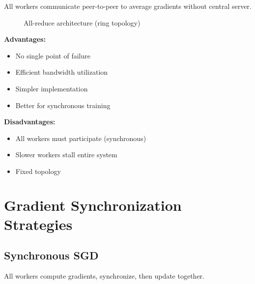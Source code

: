All workers communicate peer-to-peer to average gradients without central server.

\begin{figure}[h]
\centering
{}
\caption{All-reduce architecture (ring topology)}
\label{fig:allreduce}
\end{figure}

\textbf{Advantages:}
\begin{itemize}
    \item No single point of failure
    \item Efficient bandwidth utilization
    \item Simpler implementation
    \item Better for synchronous training
\end{itemize}

\textbf{Disadvantages:}
\begin{itemize}
    \item All workers must participate (synchronous)
    \item Slower workers stall entire system
    \item Fixed topology
\end{itemize}

\section{Gradient Synchronization Strategies}

\subsection{Synchronous SGD}

All workers compute gradients, synchronize, then update together.

